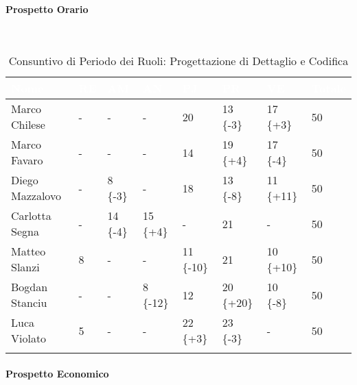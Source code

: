 \paragraph{Prospetto Orario } ~\\
\begin{longtable}{|C{.30\textwidth}|C{.06\textwidth}|C{.06\textwidth}|C{.06\textwidth} | C{.06\textwidth}| C{.06\textwidth} | C{.06\textwidth} | C{.10\textwidth} |}
	\hline
		\textbf{\textcolor{white}{Nome}} & \textbf{\textcolor{white}{RE}} & \textbf{\textcolor{white}{AM}} & \textbf{\textcolor{white}{AN}} & \textbf{\textcolor{white}{PJ}} & \textbf{\textcolor{white}{PR}} & \textbf{\textcolor{white}{VE}} & \textbf{\textcolor{white}{Totale}}\\
	\hline 
	Marco Chilese & - & - & - & 20 & 13 \{-3\} & 17 \{+3\}& 50 \\
	\hline
	Marco Favaro &  - & - & - & 14 & 19 \{+4\} & 17 \{-4\} & 50 \\
	\hline
	Diego Mazzalovo & - & 8 \{-3\} & - & 18 & 13 \{-8\} & 11 \{+11\} & 50 \\
	\hline
	Carlotta Segna & - & 14 \{-4\} & 15 \{+4\} & - & 21 & - & 50 \\
	\hline
	Matteo Slanzi & 8 & - & - & 11 \{-10\} & 21 & 10 \{+10\} & 50 \\
	\hline
	Bogdan Stanciu & - & - & 8 \{-12\} & 12 &  20 \{+20\} & 10 \{-8\} & 50 \\
	\hline
	Luca Violato & 5 & - & - & 22 \{+3\} & 23 \{-3\} & - & 50 \\   
	\hline


\caption{Consuntivo di Periodo dei Ruoli: Progettazione di Dettaglio e Codifica}
\label{CP PDC}
\end{longtable}

\paragraph{Prospetto Economico} ~\\

